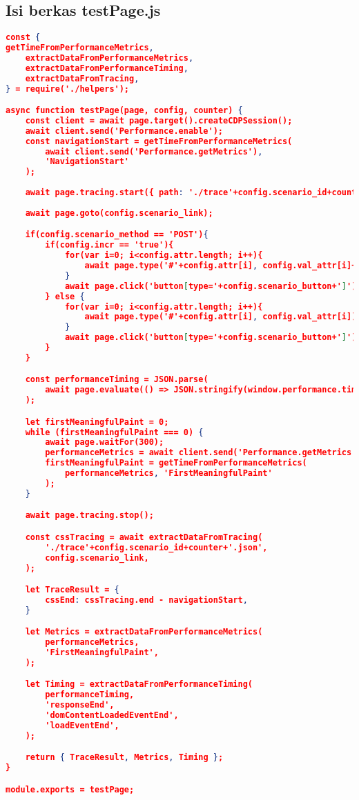	\subsection*{Isi berkas testPage.js}
\begin{lstlisting}[frame=single,tabsize=2,breaklines,caption={Isi berkas testPage.js},label=testjs, captionpos=b, language=json]
const {
getTimeFromPerformanceMetrics,
	extractDataFromPerformanceMetrics,
	extractDataFromPerformanceTiming,
	extractDataFromTracing,
} = require('./helpers');

async function testPage(page, config, counter) {
	const client = await page.target().createCDPSession();
	await client.send('Performance.enable');
	const navigationStart = getTimeFromPerformanceMetrics(
		await client.send('Performance.getMetrics'),
		'NavigationStart'
	);
	
	await page.tracing.start({ path: './trace'+config.scenario_id+counter+'.json' });
	
	await page.goto(config.scenario_link);

	if(config.scenario_method == 'POST'){
		if(config.incr == 'true'){
			for(var i=0; i<config.attr.length; i++){
				await page.type('#'+config.attr[i], config.val_attr[i]+counter);
			}
			await page.click('button[type='+config.scenario_button+']');
		} else {
			for(var i=0; i<config.attr.length; i++){
				await page.type('#'+config.attr[i], config.val_attr[i]);
			}
			await page.click('button[type='+config.scenario_button+']');
		} 
	}

	const performanceTiming = JSON.parse(
		await page.evaluate(() => JSON.stringify(window.performance.timing))
	);

	let firstMeaningfulPaint = 0;
	while (firstMeaningfulPaint === 0) {
		await page.waitFor(300);
		performanceMetrics = await client.send('Performance.getMetrics');
		firstMeaningfulPaint = getTimeFromPerformanceMetrics(
			performanceMetrics, 'FirstMeaningfulPaint'
		);
	}

	await page.tracing.stop();

	const cssTracing = await extractDataFromTracing(
		'./trace'+config.scenario_id+counter+'.json',
		config.scenario_link,
	);

	let TraceResult = {
		cssEnd: cssTracing.end - navigationStart,
	}

	let Metrics = extractDataFromPerformanceMetrics(
		performanceMetrics,
		'FirstMeaningfulPaint',
	);

	let Timing = extractDataFromPerformanceTiming(
		performanceTiming,
		'responseEnd',
		'domContentLoadedEventEnd',
		'loadEventEnd',
	);

	return { TraceResult, Metrics, Timing };
}

module.exports = testPage;
\end{lstlisting}

